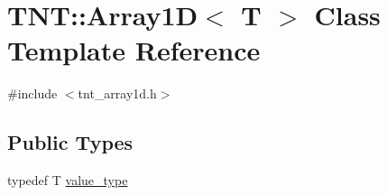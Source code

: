 \hypertarget{classTNT_1_1Array1D}{}\section{T\+NT\+:\+:Array1D$<$ T $>$ Class Template Reference}
\label{classTNT_1_1Array1D}


{\ttfamily \#include $<$tnt\+\_\+array1d.\+h$>$}

\subsection*{Public Types}
\begin{DoxyCompactItemize}
\item 
typedef T \hyperlink{classTNT_1_1Array1D_aa33efada6a804a1b32da0e315baeb29c}{value\+\_\+type}
\end{DoxyCompactItemize}
